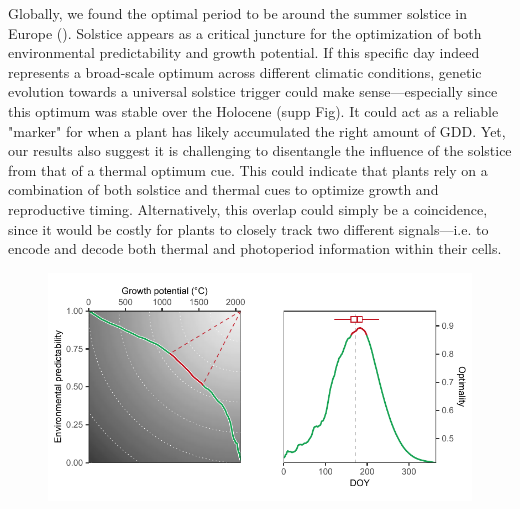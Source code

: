 \documentclass[11pt,letter]{article}
\begin{document}
Globally, we found the optimal period to be around the summer solstice in Europe (). Solstice appears as a critical juncture for the optimization of both environmental predictability and growth potential.
If this specific day indeed represents a broad-scale optimum across different climatic conditions, genetic evolution towards a universal solstice trigger could make sense---especially since this optimum was stable over the Holocene (supp Fig). 
It could act as a reliable "marker" for when a plant has likely accumulated the right amount of GDD.
Yet, our results also suggest it is challenging to disentangle the influence of the solstice from that of a thermal optimum cue.
This could indicate that plants rely on a combination of both solstice and thermal cues to optimize growth and reproductive timing. 
Alternatively, this overlap could simply be a coincidence, since it would be costly for plants to closely track two different signals---i.e. to encode and decode both thermal and photoperiod information within their cells. 

\begin{figure}[h]
\centering
\includegraphics{global_optimality.pdf}
\vspace*{-0.7cm}
\caption{}
\label{fig:globaloptimality}
\end{figure}
\end{document}
